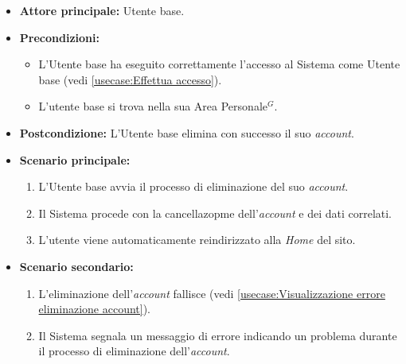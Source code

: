 \label{usecase:Eliminazione account}
\begin{itemize}
	\item \textbf{Attore principale:} Utente base.

	\item \textbf{Precondizioni:}
	      \begin{itemize}
		      \item L'Utente base ha eseguito correttamente l'accesso al Sistema come Utente base (vedi \autoref{usecase:Effettua accesso}).
		      \item L'utente base si trova nella sua Area Personale$^G$.
	      \end{itemize}

	\item \textbf{Postcondizione:} L'Utente base elimina con successo il suo \textit{account}.

	\item \textbf{Scenario principale:}
	      \begin{enumerate}
		      \item L'Utente base avvia il processo di eliminazione del suo \textit{account}.
		      \item Il Sistema procede con la cancellazopme dell'\textit{account} e dei dati correlati.
		      \item L'utente viene automaticamente reindirizzato alla \textit{Home} del sito.
	      \end{enumerate}
	\item \textbf{Scenario secondario:}
	      \begin{enumerate}
		      \item L'eliminazione dell'\textit{account} fallisce (vedi
		            \autoref{usecase:Visualizzazione errore eliminazione account}).
		      \item Il Sistema segnala un messaggio di errore indicando un problema durante il processo di eliminazione dell'\textit{account}.
	      \end{enumerate}
\end{itemize}
